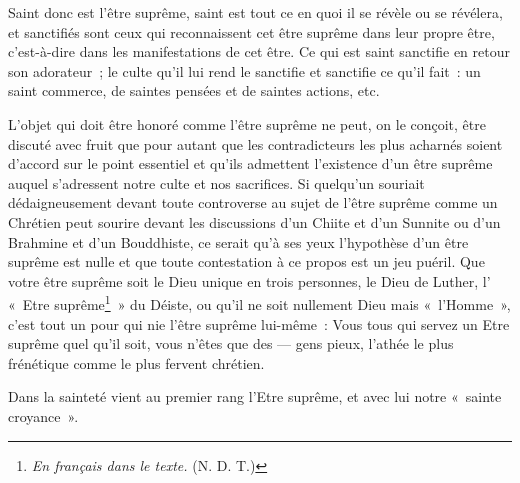 \documentclass[french,twoside]{book} %
\def\mednobreak{\ifdim\lastskip<\medskipamount
  \removelastskip\nopagebreak\medskip\fi}
\newcommand{\labelblock}[1]{\medbreak{\noindent\color{rubric}\bfseries #1}\par\mednobreak}
\begin{document}
Saint donc est l’être suprême, saint est tout ce en quoi il se révèle ou se révélera, et sanctifiés sont ceux qui reconnaissent cet être suprême dans leur propre être, c’est-à-dire dans les manifestations de cet être. Ce qui est saint sanctifie en retour son adorateur ; le culte qu’il lui rend le sanctifie et sanctifie ce qu’il fait : un saint commerce, de saintes pensées et de saintes actions, etc.\par
L’objet qui doit être honoré comme l’être suprême ne peut, on le conçoit, être discuté avec fruit que pour autant que les contradicteurs les plus acharnés soient d’accord sur le point essentiel et qu’ils admettent l’existence d’un être suprême auquel s’adressent notre culte et nos sacrifices. Si quelqu’un souriait dédaigneusement devant toute controverse au sujet de l’être suprême comme un Chrétien peut sourire devant les discussions d’un Chiite et d’un Sunnite ou d’un Brahmine et d’un Bouddhiste, ce serait qu’à ses yeux l’hypothèse d’un être suprême est nulle et que toute contestation à ce propos est un jeu puéril. Que votre être suprême soit le Dieu unique en trois personnes, le Dieu de Luther, l’ « Etre suprême\footnote{ \noindent \emph{En français dans le texte.} (N. D. T.)
 } » du Déiste, ou qu’il ne soit nullement Dieu mais « l’Homme », c’est tout un pour qui nie l’être suprême lui-même : Vous tous qui servez un  Etre suprême quel qu’il soit, vous n’êtes que des — gens pieux, l’athée le plus frénétique comme le plus fervent chrétien.\par
Dans la sainteté vient au premier rang l’Etre suprême, et avec lui notre « sainte croyance ».\par

\labelblock{Le Fantôme.}
\end{document}
